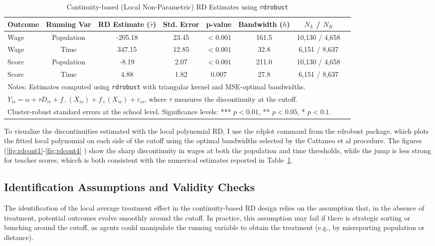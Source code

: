\documentclass{article}
\begin{document}
\begin{table}[H]
\centering
\caption{Continuity-based (Local Non-Parametric) RD Estimates using \texttt{rdrobust}}
\label{tab:local_rd}
\begin{tabular}{lccccccc}
\hline
Outcome & Running Var & RD Estimate ($\hat{\tau}$) & Std. Error & p-value & Bandwidth ($h$) & $N_L$ / $N_R$  \\
\hline
Wage   & Population & -205.18 & 23.45 & $<0.001$ & 161.5 & 10,130 / 4,658 \\
Wage   & Time       & 347.15  & 12.85 & $<0.001$ & 32.8  & 6,151 / 8,637  \\
Score  & Population & -8.19   & 2.07  & $<0.001$ & 211.0 & 10,130 / 4,658 \\
Score  & Time       & 4.88    & 1.82  & 0.007 & 27.8 & 6,151 / 8,637  \\
\hline
\multicolumn{8}{l}{\footnotesize Notes: Estimates computed using \texttt{rdrobust} with triangular kernel and MSE-optimal bandwidths.}\\
\multicolumn{8}{l}{\footnotesize $Y_{is} = \alpha + \tau D_{is} + f_-(X_{is}) + f_+(X_{is}) + \varepsilon_{is}$, where $\tau$ measures the discontinuity at the cutoff.}\\
\multicolumn{8}{l}{\footnotesize Cluster-robust standard errors at the school level. Significance levels: *** $p<0.01$, ** $p<0.05$, * $p<0.1$.}\\
\end{tabular}
\end{table}


To visualize the discontinuities estimated with the local polynomial RD, I use the rdplot command from the rdrobust package, which plots the fitted local polynomial on each side of the cutoff using the optimal bandwidths selected by the Cattaneo et al procedure. The figures (\ref{fig:rdcont1}-\ref{fig:rdcont4} ) show the sharp discontinuity in wages at both the population and time thresholds, while the jump is less strong for teacher scores, whicch is both consistent with the numerical estimates reported in Table~\ref{tab:local_rd}.


\subsection*{Identification Assumptions and Validity Checks}

The identification of the local average treatment effect in the continuity-based RD design relies on the assumption that, in the absence of treatment, potential outcomes evolve smoothly around the cutoff. In practice, this assumption may fail if there is strategic sorting or bunching around the cutoff, as agents could manipulate the running variable to obtain the treatment (e.g., by misreporting population or distance). 
\end{document}
